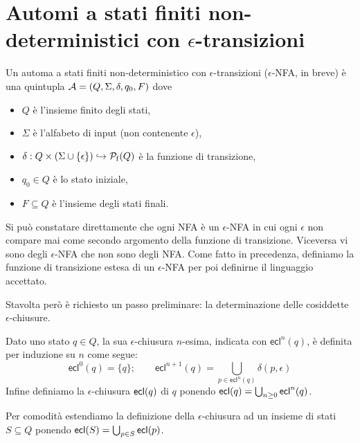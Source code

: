 \documentclass[runningheads,a4paper]{llncs}
\begin{document}
\section{Automi a stati finiti non-deterministici con $\epsilon$-transizioni}

\begin{definition}\label{def:eps-NFA}
Un automa a stati finiti non-deterministico con $\epsilon$-transizioni ($\epsilon$-NFA, in breve) \`{e} una quintupla $\mathcal{A} = (Q,\Sigma,\delta,q_0,F)$ dove 
\begin{itemize}
\item $Q$ \`{e} l'insieme finito degli stati,
\item $\Sigma$ \`{e} l'alfabeto di input (non contenente $\epsilon$),
\item $\delta: Q \times (\Sigma\cup \{\epsilon\}) \hookrightarrow \mathcal{P}_\mathrm{f}(Q)$ \`{e} la funzione di transizione,
\item $q_0 \in Q$ \`{e} lo stato iniziale,
\item $F \subseteq Q$ \`{e} l'insieme degli stati finali.
\end{itemize}
\end{definition}

Si pu\`{o} constatare direttamente che ogni NFA \`{e} un $\epsilon$-NFA in cui ogni $\epsilon$ non compare mai come secondo argomento della funzione di transizione. Viceversa vi sono degli $\epsilon$-NFA che non sono degli NFA. Come fatto in precedenza, definiamo la funzione di transizione estesa di un $\epsilon$-NFA per poi definirne il linguaggio accettato.

Stavolta per\`{o} \`{e} richiesto un passo preliminare: la determinazione delle cosiddette $\epsilon$-chiusure. 

\begin{definition}\label{def:eps-chius}
Dato uno stato $q \in Q$, la sua $\epsilon$-chiusura $n$-esima, indicata con $\textsf{ecl}^n(q)$, \`{e} definita per induzione su $n$ come segue:
$$ \textsf{ecl}^0(q) = \{q\}; \qquad \textsf{ecl}^{n+1}(q) = \bigcup_{p \in \textsf{ecl}^{n}(q)} \delta(p,\epsilon) $$
Infine definiamo la $\epsilon$-chiusura $\mathsf{ecl}(q)$ di $q$ ponendo $\mathsf{ecl}(q) = \bigcup_{n \geq 0} \textsf{ecl}^{n}(q)$.
\end{definition}

Per comodit\`{a} estendiamo la definizione della $\epsilon$-chiusura ad un insieme di stati $S \subseteq Q$ ponendo $\mathsf{ecl}(S) = \bigcup_{p \in S} \mathsf{ecl}(p)$.
\end{document}
